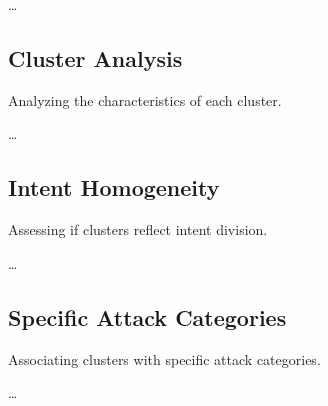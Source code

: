         \ldots
        
    \subsection{Cluster Analysis}
    
        Analyzing the characteristics of each cluster.

        \ldots
        
    \subsection{Intent Homogeneity}
    
        Assessing if clusters reflect intent division.

        \ldots
        
    \subsection{Specific Attack Categories}
    
        Associating clusters with specific attack categories.

        \ldots
